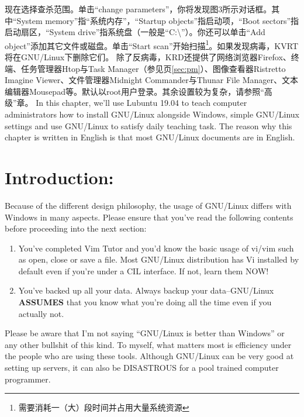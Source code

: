 现在选择查杀范围。单击“change parameters”，你将发现图3所示对话框。其中“System memory”指“系统内存”，“Startup objects”指启动项，“Boot sectors”指启动扇区，“System drive”指系统盘（一般是“C:\textbackslash”）。你还可以单击“Add object”添加其它文件或磁盘。单击“Start scan”开始扫描\footnote{需要消耗一（大）段时间并占用大量系统资源}。如果发现病毒，KVRT将在GNU/Linux下删除它们。
除了反病毒，KRD还提供了网络浏览器Firefox、终端、任务管理器Htop与Task Manager（参见\pageref{sec:pm}页\ref{sec:pm}）、图像查看器Ristretto Imagine Viewer、文件管理器Midnight Commander与Thunar File Manager、文本编辑器Mousepad等。默认以root用户登录。其余设置较为复杂，请参照“高级”章。
In this chapter, we'll use Lubuntu 19.04 to teach computer administrators how to install GNU/Linux alongside Windows, simple GNU/Linux settings and use GNU/Linux to satisfy daily teaching task. The reason why this chapter is written in English is that most GNU/Linux documents are in English.\par
\section{Introduction: }
Because of the different design philosophy, the usage of GNU/Linux differs with Windows in many aspects. Please ensure that you've read the following contents before proceeding into the next section:
\begin{enumerate}
	\item You've completed Vim Tutor and you'd know the basic usage of vi/vim such as open, close or save a file. Most GNU/Linux distribution has Vi installed by default even if you're under a CIL interface. If not, learn them NOW!
	\item You've backed up all your data. Always backup your data--GNU/Linux \textbf{ASSUMES} that you know what you're doing all the time even if you actually not.
\end{enumerate}
Please be aware that I'm not saying ``GNU/Linux is better than Windows'' or any other bullshit of this kind. To myself, what matters most is efficiency under the people who are using these tools. Although GNU/Linux can be very good at setting up servers, it can also be DISASTROUS for a pool trained computer programmer.
